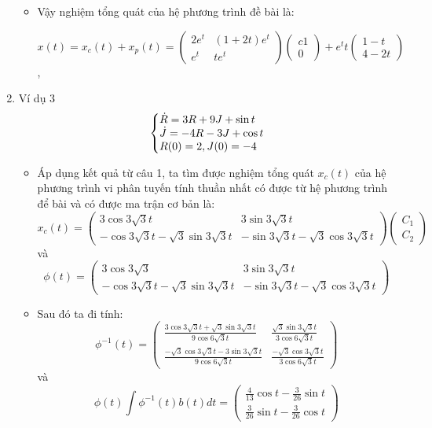 \documentclass[a4paper]{article}
\begin{document}
\begin{enumerate}
\begin{itemize}
    \item Vậy nghiệm tổng quát của hệ phương trình đề bài là: 
        \begin{center}
                $x(t) = x_c(t) + x_p(t) = \left( \begin{matrix} 2e^{t} & (1+2t)e^{t} \\ e^{t} & te^{t} \end{matrix} \right) \left( \begin{matrix}{c} 1 \\ 0 \end{matrix} \right) + e^{t}t \left( \begin{matrix} 1-t\\ 4-2t \end{matrix} \right)$,
        \end{center}
    \end{itemize}
\item Ví dụ 3  $$\left\{\begin{array}{@{}l@{}}
            \dot{R} = 3R + 9J + \sin{t} \\
            \dot{J} =  -4R - 3J + \cos{t} \\
            R(0) = 2, J(0) = -4
        \end{array}\right.$$
    \begin{itemize}
    \item Áp dụng kết quả từ câu 1, ta tìm được nghiệm tổng quát $x_c(t)$ của hệ phương trình vi phân tuyến tính thuần nhất có được từ hệ phương trình để bài và có được ma trận cơ bản là:
        $$x_c(t) = \left( \begin{matrix} 3\cos{3\sqrt{3}t} & 3\sin{3\sqrt{3}t} \\ -\cos{3\sqrt{3}t} - \sqrt{3}\sin{3\sqrt{3}t} & -\sin{3\sqrt{3}t} - \sqrt{3}\cos{3\sqrt{3}t} \end{matrix} \right) \left( \begin{matrix} C_1 \\ C_2 \end{matrix} \right)$$
        và
        $$\phi(t) = \left( \begin{matrix} 3\cos{3\sqrt{3}} & 3\sin{3\sqrt{3}t} \\ -\cos{3\sqrt{3}t} - \sqrt{3}\sin{3\sqrt{3}t} & -\sin{3\sqrt{3}t} - \sqrt{3}\cos{3\sqrt{3}t} \end{matrix} \right)$$
    \item Sau đó ta đi tính:
        $$\phi^{-1}(t) = \left( \begin{matrix} \frac{3\cos{3\sqrt{3}t} + \sqrt{3}\sin{3\sqrt{3}t}}{9\cos{6\sqrt{3}t}} & \frac{\sqrt{3}\sin{3\sqrt{3}t}}{3\cos{6\sqrt{3}t}} \\ \frac{-\sqrt{3}\cos{3\sqrt{3}t} -3 \sin{3\sqrt{3}t}}{9\cos{6\sqrt{3}t}} & \frac{-\sqrt{3}\cos{3\sqrt{3}t}}{3\cos{6\sqrt{3}t}}\end{matrix} \right)$$ và $$\phi(t)\int\phi^{-1}(t)b(t)dt = \left( \begin{matrix} \frac{4}{13}\cos{t}-\frac{3}{26}\sin{t} \\[4pt] \frac{3}{26}\sin{t}-\frac{3}{26}\cos{t} \end{matrix} \right)$$

\end{itemize}
\end{enumerate}
\end{document}
